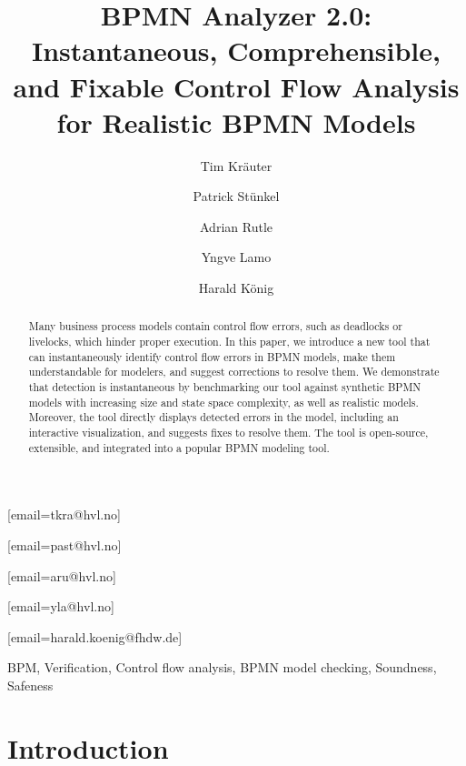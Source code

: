 \documentclass[
twocolumn
]{ceurart}
\begin{document}


\title{BPMN Analyzer 2.0: Instantaneous, Comprehensible, and Fixable Control Flow Analysis for Realistic BPMN Models}

\author[1]{Tim Kräuter}
[email=tkra@hvl.no]
\author[1]{Patrick Stünkel}
[email=past@hvl.no] %
\author[1]{Adrian Rutle}
[email=aru@hvl.no]
\author[1]{Yngve Lamo}
[email=yla@hvl.no]
\author[2,1]{Harald König}
[email=harald.koenig@fhdw.de]
\address[1]{Western Norway University of Applied Sciences, Bergen, Norway}
\address[2]{FHDW Hannover, Germany}

\begin{abstract}
Many business process models contain control flow errors, such as deadlocks or livelocks, which hinder proper execution.
In this paper, we introduce a new tool that can instantaneously identify control flow errors in BPMN models, make them understandable for modelers, and suggest corrections to resolve them.
We demonstrate that detection is instantaneous by benchmarking our tool against synthetic BPMN models with increasing size and state space complexity, as well as realistic models.
Moreover, the tool directly displays detected errors in the model, including an interactive visualization, and suggests fixes to resolve them.
The tool is open-source, extensible, and integrated into a popular BPMN modeling tool.
\end{abstract}

\begin{keywords}
BPM,
Verification,
Control flow analysis,
BPMN model checking,
Soundness,
Safeness
\end{keywords}

\maketitle

\section{Introduction}
\end{document}
